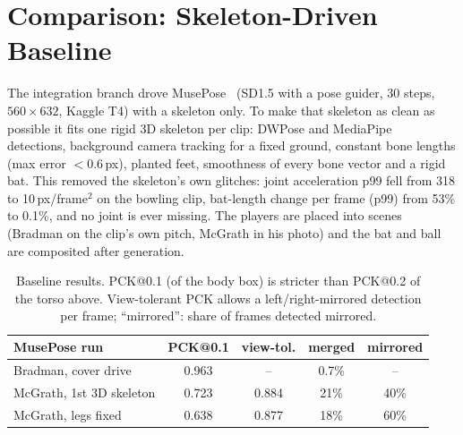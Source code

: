 \section{Comparison: Skeleton-Driven Baseline}
The integration branch drove MusePose~\cite{musepose2024} (SD1.5 with a pose guider, 30 steps, $560{\times}632$, Kaggle
T4) with a skeleton only. To make that skeleton as clean as possible it fits one rigid 3D skeleton per clip: DWPose and
MediaPipe~\cite{bazarevsky2020blazepose} detections, background camera tracking for a fixed ground, constant bone
lengths (max error $<0.6$\,px), planted feet, smoothness of every bone vector and a rigid bat. This removed the
skeleton's own glitches: joint acceleration p99 fell from 318 to 10\,px/frame$^2$ on the bowling clip, bat-length change
per frame (p99) from 53\% to 0.1\%, and no joint is ever missing. The players are placed into scenes (Bradman on the
clip's own pitch, McGrath in his photo) and the bat and ball are composited after generation.

\begin{table}[t]
\centering\small
\setlength{\tabcolsep}{2.2pt}
\begin{tabular}{lcccc}
\toprule
MusePose run & PCK@0.1 & view-tol. & merged & mirrored\\
\midrule
Bradman, cover drive & 0.963 & -- & 0.7\% & --\\
McGrath, 1st 3D skeleton & 0.723 & 0.884 & 21\% & 40\%\\
McGrath, legs fixed & 0.638 & 0.877 & 18\% & 60\%\\
\bottomrule
\end{tabular}
\caption{Baseline results. PCK@0.1 (of the body box) is stricter than PCK@0.2 of the torso above. View-tolerant PCK
allows a left/right-mirrored detection per frame; ``mirrored'': share of frames detected mirrored.}
\label{tab:baseline}
\end{table}

